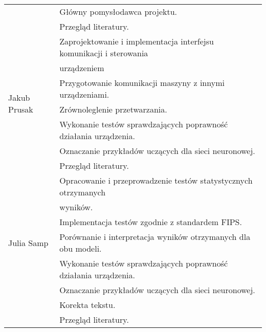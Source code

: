 \begin{table} [H]
\begin{tabular}{|l|l|}
            & Główny pomysłodawca projektu. \\
            & Przegląd literatury. \\
        \hline
        \multirow{7}{*}{Jakub Prusak} 
            & Zaprojektowanie i implementacja interfejsu komunikacji i sterowania \\
            & urządzeniem\\
            & Przygotowanie komunikacji maszyny z innymi urządzeniami. \\
            & Zrównoleglenie przetwarzania. \\
            & Wykonanie testów sprawdzających poprawność działania urządzenia. \\
            & Oznaczanie przykładów uczących dla sieci neuronowej. \\
            & Przegląd literatury. \\
        \hline
        \multirow{7}{*}{Julia Samp} 
            & Opracowanie i przeprowadzenie testów statystycznych otrzymanych \\
            & wyników. \\
            & Implementacja testów zgodnie z standardem FIPS. \\
            & Porównanie i interpretacja wyników otrzymanych dla obu modeli. \\
            & Wykonanie testów sprawdzających poprawność działania urządzenia. \\
            & Oznaczanie przykładów uczących dla sieci neuronowej. \\
            & Korekta tekstu. \\
            & Przegląd literatury. \\
        \hline  
    \end{tabular} 
\end{table}   
